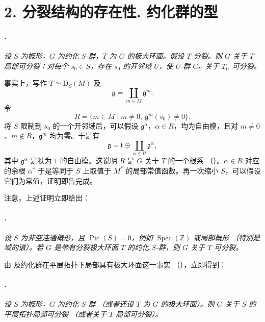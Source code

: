 \section*{2. 分裂结构的存在性. 约化群的型}

\paragraph{.}
\textit{设 \(S\) 为概形，\(G\) 为约化 \(S\)-群，\(T\) 为 \(G\) 的极大环面。假设 \(T\) 分裂。则 \(G\) 关于 \(T\) 局部可分裂：对每个 \(s_0\in S\)，存在 \(s_0\) 的开邻域 \(U\)，使 \(U\)-群 \(G_U\) 关于 \(T_U\) 可分裂。}

事实上，写作 \(T\simeq\mathrm D_S(M)\) 及
\[
  \mathfrak g=\coprod_{m\in M}\mathfrak g^m.
\]
令
\[
  R=\{m\in M\mid m\ne0,\ \mathfrak g^m(s_0)\ne0\}.
\]
将 \(S\) 限制到 \(s_0\) 的一个开邻域后，可以假设 \(\mathfrak g^\alpha\)，\(\alpha\in R\)，均为自由模，且对 \(m\ne0\)、\(m\notin R\)，\(\mathfrak g^m\) 均为零。于是有
\[
  \mathfrak g
  =
  \mathfrak t\oplus
  \coprod_{\alpha\in R}\mathfrak g^\alpha,
\]
其中 \(\mathfrak g^\alpha\) 是秩为 \(1\) 的自由模。这说明 \(R\) 是 \(G\) 关于 \(T\) 的一个根系 \textup{（）}。\(\alpha\in R\) 对应的余根 \(\alpha^*\) 于是等同于 \(S\) 上取值于 \(M^*\) 的局部常值函数。再一次缩小 \(S\)，可以假设它们为常值，证明即告完成。

注意，上述证明立即给出：

\paragraph{.}
\textit{设 \(S\) 为非空连通概形，且 \(\operatorname{Pic}(S)=0\)，例如 \(\operatorname{Spec}(\mathbb Z)\) 或局部概形 \textup{（特别是域的谱）}。若 \(G\) 是带有分裂极大环面 \(T\) 的约化 \(S\)-群，则 \(G\) 关于 \(T\) 可分裂。}

由  及约化群在平展拓扑下局部具有极大环面这一事实 \textup{（）}，立即得到：

\paragraph{.}
\textit{设 \(S\) 为概形，\(G\) 为约化 \(S\)-群 \textup{（或者还设 \(T\) 为 \(G\) 的极大环面）}。则 \(G\) 关于 \(S\) 的平展拓扑局部可分裂 \textup{（或者关于 \(T\) 局部可分裂）}。}

